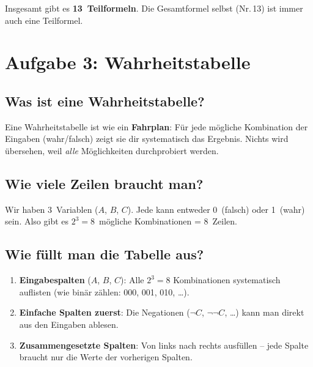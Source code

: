 \documentclass[a4paper,12pt]{article}
\begin{document}
\begin{merkbox}
Insgesamt gibt es \textbf{13~Teilformeln}. Die Gesamtformel selbst
(Nr.\,13) ist immer auch eine Teilformel.
\end{merkbox}

\newpage

\section{Aufgabe 3: Wahrheitstabelle}

\subsection{Was ist eine Wahrheitstabelle?}

\begin{analogie}
Eine Wahrheitstabelle ist wie ein \textbf{Fahrplan}: F\"ur jede
m\"ogliche Kombination der Eingaben (wahr/falsch) zeigt sie dir
systematisch das Ergebnis. Nichts wird \"ubersehen, weil \emph{alle}
M\"oglichkeiten durchprobiert werden.
\end{analogie}

\subsection{Wie viele Zeilen braucht man?}

Wir haben 3~Variablen ($A$, $B$, $C$). Jede kann entweder 0~(falsch)
oder 1~(wahr) sein. Also gibt es $2^3 = 8$~m\"ogliche Kombinationen
= 8~Zeilen.

\subsection{Wie f\"ullt man die Tabelle aus?}

\begin{enumerate}
\item \textbf{Eingabespalten} ($A$, $B$, $C$): Alle $2^3 = 8$ Kombinationen
      systematisch auflisten (wie bin\"ar z\"ahlen: 000, 001, 010, \ldots).
\item \textbf{Einfache Spalten zuerst}: Die Negationen ($\neg C$,
      $\neg\neg C$, \ldots) kann man direkt aus den Eingaben ablesen.
\item \textbf{Zusammengesetzte Spalten}: Von links nach rechts ausf\"ullen --
      jede Spalte braucht nur die Werte der vorherigen Spalten.
\end{enumerate}
\end{document}
